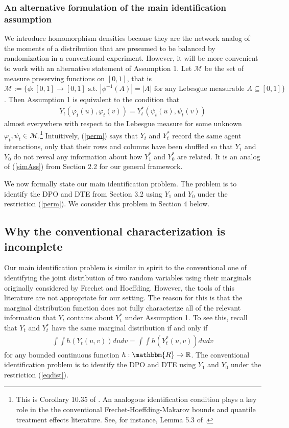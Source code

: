 \documentclass[12pt]{article}
\theoremstyle{definition}
\begin{document}
\subsubsection{An alternative formulation of the main identification assumption}
We introduce homomorphism densities because they are the network analog of the moments of a distribution that are  presumed to be balanced by randomization in a conventional experiment. However, it will be more convenient to work with an alternative statement of Assumption 1. Let $\mathcal{M}$ be the set of measure preserving functions on $[0,1]$, that is $\mathcal{M} := \{\phi: [0,1] \to [0,1]\text{ s.t. } |\phi^{-1}(A)| = |A| \text{ for any Lebesgue measurable } A \subseteq [0,1]\}$. Then Assumption 1 is equivalent to the condition that 
 \begin{align}\label{perm}
 Y_{t}(\varphi_{t}(u),\varphi_{t}(v)) = Y_{t}^{*}(\psi_{t}(u),\psi_{t}(v))
 \end{align}
 almost everywhere with respect to the Lebesgue measure for some unknown  $\varphi_{t}, \psi_{t} \in \mathcal{M}$.\footnote{This is Corollary 10.35 of \cite{lovasz2012large}. An analogous identification condition plays a key role in the  the conventional Frechet-Hoeffding-Makarov bounds and quantile treatment effects literature. See, for instance, Lemma 5.3 of \cite{whitt1976bivariate}.}  Intuitively, (\ref{perm}) says that $Y_{t}$ and $Y_{t}^{*}$ record the same agent interactions, only that their rows and columns have been shuffled so that $Y_{1}$ and $Y_{0}$ do not reveal any information about how $Y_{1}^{*}$ and $Y_{0}^{*}$ are related. It is an analog of (\ref{simAss}) from Section 2.2 for our general framework.  

We now formally state our main identification problem. The problem is to identify the DPO and DTE from Section 3.2 using $Y_{1}$ and $Y_{0}$  under the restriction (\ref{perm}). We consider this problem in Section 4 below. 

  \subsection{Why the conventional characterization is incomplete}
Our main identification problem is similar in spirit to the conventional one of identifying the joint distribution of two random variables using their marginals originally considered by Frechet and Hoeffding. However, the tools of this literature are not appropriate for our setting. The reason for this is that the marginal distribution function does not fully characterize all of the relevant information that $Y_{t}$ contains about $Y_{t}^{*}$ under Assumption 1. To see this, recall that $Y_{t}$ and $Y_{t}^{*}$ have the same marginal distribution if and only if
    \begin{align}\label{eqdist}
   \int\int h(Y_{t}(u,v)) dudv = \int\int h(Y_{t}^{*}(u,v)) dudv
   \end{align}
   for any bounded continuous function $h: \mathbbm{R} \to \mathbb{R}$. The conventional identification problem is to identify the DPO and DTE using $Y_{1}$ and $Y_{0}$ under the restriction (\ref{eqdist}).  
\end{document}
